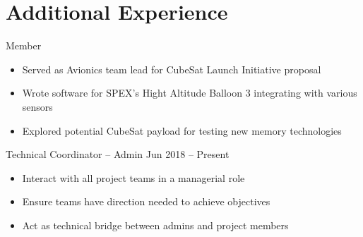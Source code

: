 \documentclass[10pt,final,sans]{resume}
\begin{document}
\section{Additional Experience}
Member
\begin{itemize}
  \item Served as Avionics team lead for CubeSat Launch Initiative proposal
  \item Wrote software for SPEX's Hight Altitude Balloon 3 integrating with various sensors
  \item Explored potential CubeSat payload for testing new memory technologies
\end{itemize}
Technical Coordinator -- Admin \hfill Jun 2018 -- Present
\begin{itemize}
  \item Interact with all project teams in a managerial role
  \item Ensure teams have direction needed to achieve objectives
  \item Act as technical bridge between admins and project members
\end{itemize}
\end{document}
